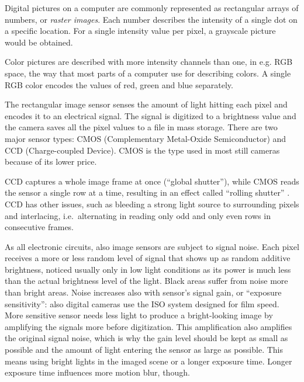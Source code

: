 
Digital pictures on a computer are commonly represented as rectangular arrays of numbers, or \emph{raster images}.
Each number describes the intensity of a single dot on a specific location.
For a single intensity value per pixel, a grayscale picture would be obtained.

Color pictures are described with more intensity channels than one, in e.g. RGB space, the way that most parts of a computer use for describing colors.
A single RGB color encodes the values of red, green and blue separately.


The rectangular image sensor senses the amount of light hitting each pixel and encodes it to an electrical signal.
The signal is digitized to a brightness value and the camera saves all the pixel values to a file in mass storage.
There are two major sensor types: CMOS (Complementary Metal-Oxide Semiconductor) and CCD (Charge-coupled Device).
CMOS is the type used in most still cameras because of its lower price.

CCD captures a whole image frame at once (``global shutter''), while CMOS reads the sensor a single row at a time, resulting in an effect called ``rolling shutter'' \cite{todo:cmos}.
CCD has other issues, such as bleeding a strong light source to surrounding pixels and interlacing, i.e.~alternating in reading only odd and only even rows in consecutive frames.


As all electronic circuits, also image sensors are subject to signal noise.
Each pixel receives a more or less random level of signal that shows up as random additive brightness, noticed usually only in low light conditions as its power is much less than the actual brightness level of the light.
Black areas suffer from noise more than bright areas.
Noise increases also with sensor's signal gain, or ``exposure sensitivity'': also digital cameras use the ISO system designed for film speed.
More sensitive sensor needs less light to produce a bright-looking image by amplifying the signals more before digitization.
This amplification also amplifies the original signal noise, which is why the gain level should be kept as small as possible and the amount of light entering the sensor as large as possible.
This means using bright lights in the imaged scene or a longer exposure time.
Longer exposure time influences more motion blur, though.

